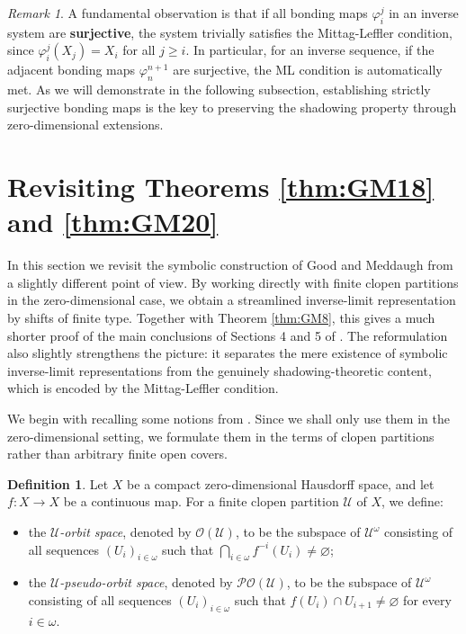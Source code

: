 \documentclass[12pt]{amsart}
\theoremstyle{definition}
\newtheorem{definition}[theorem]{Definition}
\numberwithin{equation}{section}
\theoremstyle{remark}
\newtheorem{remark}[theorem]{Remark}
\begin{document}
\begin{remark}\label{rmk:trivial_ML}
A fundamental observation is that if all bonding maps $\varphi_i^j$ in an inverse system are \textbf{surjective}, the system trivially satisfies the Mittag-Leffler condition, since $\varphi_i^j(X_j) = X_i$ for all $j \ge i$. In particular, for an inverse sequence, if the adjacent bonding maps $\varphi_n^{n+1}$ are surjective, the ML condition is automatically met. As we will demonstrate in the following subsection, establishing strictly surjective bonding maps is the key to preserving the shadowing property through zero-dimensional extensions.
\end{remark}


\section{Revisiting Theorems \ref{thm:GM18} and \ref{thm:GM20}}\label{revisit}

In this section we revisit the symbolic construction of Good and Meddaugh
from a slightly different point of view. By working directly with finite clopen
partitions in the zero-dimensional case, we obtain a streamlined inverse-limit
representation by shifts of finite type. Together with Theorem \ref{thm:GM8},
this gives a much shorter proof of the main conclusions of Sections 4 and 5 of
\cite{GM}. The reformulation also slightly strengthens the picture: it separates
the mere existence of symbolic inverse-limit representations from the genuinely
shadowing-theoretic content, which is encoded by the Mittag-Leffler condition.

We begin with recalling some notions from \cite{GM}. Since we shall only use them in the zero-dimensional setting, we formulate them in the terms of clopen partitions rather than arbitrary finite open covers.

\begin{definition}
Let $X$ be a compact zero-dimensional Hausdorff space, and let $f:X\to X$ be a
continuous map. For a finite clopen partition $\mathcal U$ of $X$, we define:
\begin{itemize}
\item the \emph{$\mathcal U$-orbit space}, denoted by
$\mathcal O(\mathcal U)$, to be the subspace of $\mathcal U^\omega$ consisting
of all sequences $(U_i)_{i\in\omega}$ such that
$\bigcap_{i\in\omega} f^{-i}(U_i)\neq\varnothing$;

\item the \emph{$\mathcal U$-pseudo-orbit space}, denoted by
$\mathcal{PO}(\mathcal U)$, to be the subspace of $\mathcal U^\omega$ consisting
of all sequences $(U_i)_{i\in\omega}$ such that
$f(U_i)\cap U_{i+1}\neq\varnothing$ for every $i\in\omega$.
\end{itemize}
\end{definition}
\end{document}

